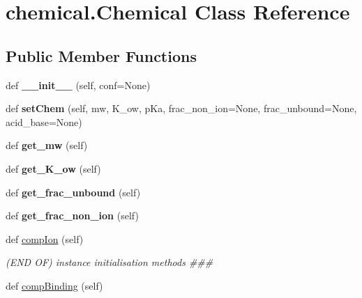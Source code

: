 \hypertarget{classchemical_1_1Chemical}{}\section{chemical.\+Chemical Class Reference}
\label{classchemical_1_1Chemical}
\subsection*{Public Member Functions}
\begin{DoxyCompactItemize}
\item 
def {\bfseries \+\_\+\+\_\+init\+\_\+\+\_\+} (self, conf=None)\hypertarget{classchemical_1_1Chemical_a23a6f4fc90c0113dbda6d2e510029fdd}{}\label{classchemical_1_1Chemical_a23a6f4fc90c0113dbda6d2e510029fdd}

\item 
def {\bfseries set\+Chem} (self, mw, K\+\_\+ow, p\+Ka, frac\+\_\+non\+\_\+ion=None, frac\+\_\+unbound=None, acid\+\_\+base=None)\hypertarget{classchemical_1_1Chemical_a9149275a71ae075228b7d32aa45458d9}{}\label{classchemical_1_1Chemical_a9149275a71ae075228b7d32aa45458d9}

\item 
def {\bfseries get\+\_\+mw} (self)\hypertarget{classchemical_1_1Chemical_a938a38840c7c5e2e969458f0fa4837d3}{}\label{classchemical_1_1Chemical_a938a38840c7c5e2e969458f0fa4837d3}

\item 
def {\bfseries get\+\_\+\+K\+\_\+ow} (self)\hypertarget{classchemical_1_1Chemical_a52c7373a29fd5e3be3bb2866711093f8}{}\label{classchemical_1_1Chemical_a52c7373a29fd5e3be3bb2866711093f8}

\item 
def {\bfseries get\+\_\+frac\+\_\+unbound} (self)\hypertarget{classchemical_1_1Chemical_a14a789f44a29b8e8108d16dca58a34ca}{}\label{classchemical_1_1Chemical_a14a789f44a29b8e8108d16dca58a34ca}

\item 
def {\bfseries get\+\_\+frac\+\_\+non\+\_\+ion} (self)\hypertarget{classchemical_1_1Chemical_a0227ca686a08be6d0213d8ef714eed0f}{}\label{classchemical_1_1Chemical_a0227ca686a08be6d0213d8ef714eed0f}

\item 
def \hyperlink{classchemical_1_1Chemical_a3633520af63f8eb799a8f0de381422e0}{comp\+Ion} (self)
\begin{DoxyCompactList}\small\item\em (E\+ND OF) instance initialisation methods \#\#\# \end{DoxyCompactList}\item 
def \hyperlink{classchemical_1_1Chemical_af738fbeec1e013883784f479ffa19852}{comp\+Binding} (self)
\end{DoxyCompactItemize}
